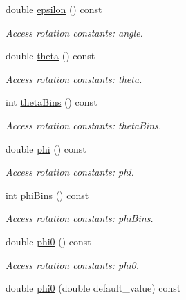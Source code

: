 \begin{DoxyCompactItemize}
double \hyperlink{struct_d_d4hep_1_1_x_m_l_1_1_child_value_acd872e71652ddfc7f5064d42521de73a}{epsilon} () const 
\begin{DoxyCompactList}\small\item\em Access rotation constants: angle. \item\end{DoxyCompactList}\item 
double \hyperlink{struct_d_d4hep_1_1_x_m_l_1_1_child_value_af09e2214cf2a4d96728599e05867c985}{theta} () const 
\begin{DoxyCompactList}\small\item\em Access rotation constants: theta. \item\end{DoxyCompactList}\item 
int \hyperlink{struct_d_d4hep_1_1_x_m_l_1_1_child_value_a1e42f8a32e0aab1712bd571cf1219d3e}{thetaBins} () const 
\begin{DoxyCompactList}\small\item\em Access rotation constants: thetaBins. \item\end{DoxyCompactList}\item 
double \hyperlink{struct_d_d4hep_1_1_x_m_l_1_1_child_value_a53f99a782b104474a42603a3e6175cfb}{phi} () const 
\begin{DoxyCompactList}\small\item\em Access rotation constants: phi. \item\end{DoxyCompactList}\item 
int \hyperlink{struct_d_d4hep_1_1_x_m_l_1_1_child_value_aa3115af27580c0c2db2387744ad00d52}{phiBins} () const 
\begin{DoxyCompactList}\small\item\em Access rotation constants: phiBins. \item\end{DoxyCompactList}\item 
double \hyperlink{struct_d_d4hep_1_1_x_m_l_1_1_child_value_a7b7e5da8a71f3b7fb51f0b5322d4af23}{phi0} () const 
\begin{DoxyCompactList}\small\item\em Access rotation constants: phi0. \item\end{DoxyCompactList}\item 
double \hyperlink{struct_d_d4hep_1_1_x_m_l_1_1_child_value_a85b2176e59268e8ca1254a07b76ee88f}{phi0} (double default\_\-value) const 

\end{DoxyCompactItemize}
